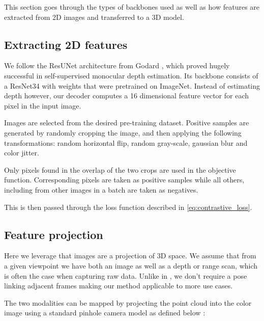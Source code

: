 \documentclass[10pt,twocolumn,letterpaper]{article}
\newcommand{\AJ}[1]{{\color{red}{[Andrej: #1]}}}
\begin{document}
This section goes through the types of backbones used as well as how features are extracted from 2D images and transferred to a 3D model.

\AJ{Need a picture depicting the pipeline}

\subsection{Extracting 2D features}
\label{sec:method:features2d}

We follow the ResUNet architecture from Godard \etal \cite{godard2019Digging}, which proved hugely successful in self-supervised monocular depth estimation. Its backbone consists of a ResNet34 with weights that were pretrained on ImageNet. Instead of estimating depth however, our decoder computes a 16 dimensional feature vector for each pixel in the input image.

Images are selected from the desired pre-training dataset. Positive samples are generated by randomly cropping the image, and then applying the following transformations: random horizontal flip, random gray-scale, gaussian blur and color jitter.

Only pixels found in the overlap of the two crops are used in the objective function. Corresponding pixels are taken as positive samples while all others, including from other images in a batch are taken as negatives.

This is then passed through the loss function described in \ref{eq:contrastive_loss}.

\AJ{Add figure of what your feature extractor looks like}

\AJ{Need to review how I do this in the code, I think I use a projector left over from BYOL}

\subsection{Feature projection}
\label{sec:featureProjection}

Here we leverage that images are a projection of 3D space. We assume that from a given viewpoint we have both an image as well as a depth or range scan, which is often the case when capturing raw data. Unlike in \cite{xie2020pointcontrast}, we don't require a pose linking adjacent frames making our method applicable to more use cases.

The two modalities can be mapped by projecting the point cloud into the color image using a standard pinhole camera model as defined below \cite{?}:
\end{document}
